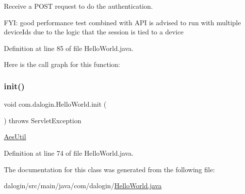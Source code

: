 Receive a P\+O\+ST request to do the authentication.

F\+YI\+: good performance test combined with A\+PI is advised to run with multiple device\+Ids due to the logic that the session is tied to a device 

Definition at line 85 of file Hello\+World.\+java.

Here is the call graph for this function\+:
\mbox{\label{classcom_1_1dalogin_1_1_hello_world_a77eee8b13b0518d10d453163b759118e}} 
\subsubsection{\texorpdfstring{init()}{init()}}
{\footnotesize\ttfamily void com.\+dalogin.\+Hello\+World.\+init (\begin{DoxyParamCaption}{ }\end{DoxyParamCaption}) throws Servlet\+Exception}

\hyperlink{}{Aes\+Util} 

Definition at line 74 of file Hello\+World.\+java.



The documentation for this class was generated from the following file\+:\begin{DoxyCompactItemize}
\item 
dalogin/src/main/java/com/dalogin/\hyperlink{_hello_world_8java}{Hello\+World.\+java}\end{DoxyCompactItemize}

